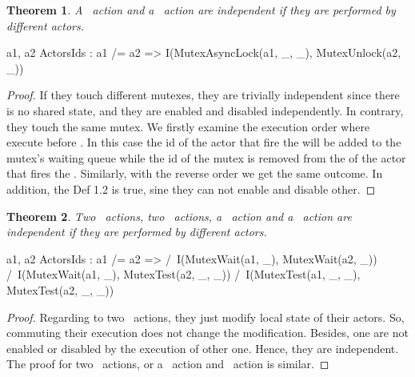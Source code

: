 \documentclass[a4paper,11pt]{article}
\theoremstyle{break}
\newtheorem{theorem}{Theorem}[section]
\begin{document}
\begin{theorem}
	A \mutexlock~action and a \mutexunlock~action are independent if they are performed by different actors.
\end{theorem}
\begin{tla}
\forall a1, a2 \in ActorsIds : a1 /= a2
		=> I(MutexAsyncLock(a1, _, _), MutexUnlock(a2, _))
\end{tla}
\begin{tlatex}
%
\end{tlatex}
\begin{proof}
	If they touch different mutexes, they are trivially independent since there is no shared state, and they are enabled and disabled independently. In contrary, they touch the same mutex. We firstly examine the execution order where \mutexlock execute before \mutexunlock. In this case the id of the actor that fire the \mutexlock will be added to the mutex's waiting queue while the id of the mutex is removed from the \request of the actor that fires the \mutexunlock. Similarly, with the reverse order we get the same outcome. In addition, the Def 1.2 is true, sine they can not enable and disable other. 
\end{proof}	
\begin{theorem}
Two \mutexwait~actions, two \mutextest~actions, a \mutexwait~action and a \mutextest~action are independent if they are performed by different actors.
\end{theorem}
\begin{tla}
\forall a1, a2 \in ActorsIds : a1 /= a2 => 
		/\ I(MutexWait(a1, _), MutexWait(a2, _))
		/\ I(MutexWait(a1, _), MutexTest(a2, _, _))
		/\ I(MutexTest(a1, _, _), MutexTest(a2, _, _))	
\end{tla}
\begin{tlatex}
%
\end{tlatex}

\begin{proof}
Regarding to two \mutexwait~actions, they just modify local state of their actors. So, commuting their execution does not change the modification. Besides, one are not enabled or disabled by the execution of other one. Hence, they are independent. The proof for two \mutextest~actions, or a \mutexwait~action and \mutextest~action is similar.
\end{proof}
\end{document}
